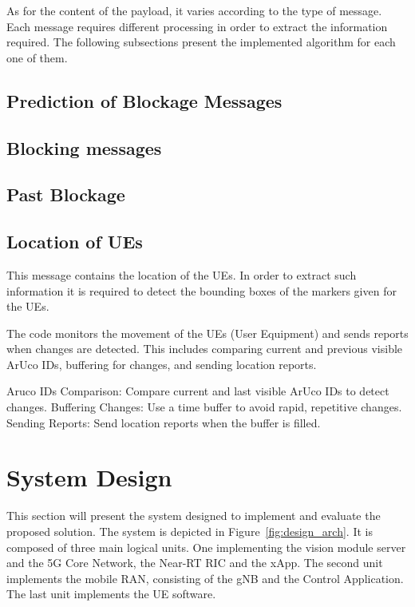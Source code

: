 As for the content of the payload, it varies according to the type of message.
Each message requires different processing in order to extract the information required.
The following subsections present the implemented algorithm for each one of them. 

\subsection{Prediction of Blockage Messages}



\subsection{Blocking messages}

\subsection{Past Blockage}

\subsection{Location of UEs}
This message contains the location of the UEs. In order to extract such information it is required to detect the bounding boxes of the markers given for the UEs. 

The code monitors the movement of the UEs (User Equipment) and sends reports when changes are detected. This includes comparing current and previous visible ArUco IDs, buffering for changes, and sending location reports.

    Aruco IDs Comparison:
        Compare current and last visible ArUco IDs to detect changes.
    Buffering Changes:
        Use a time buffer to avoid rapid, repetitive changes.
    Sending Reports:
        Send location reports when the buffer is filled.


\section{System Design}\label{sec:design}
This section will present the system designed to implement and evaluate the proposed solution.
The system is depicted in Figure~\ref{fig:design_arch}.
It is composed of three main logical units.
One implementing the vision module server and the 5G Core Network, the Near-RT RIC and the xApp. %
The second unit implements the mobile RAN, consisting of the gNB and the Control Application. %
The last unit implements the UE software.


